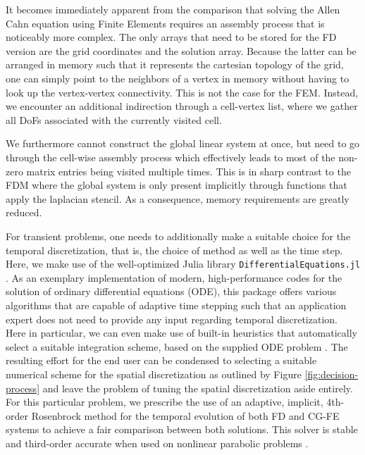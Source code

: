 \documentclass[asi,article,submit,moreauthors]{Definitions/mdpi}
\begin{document}
It becomes immediately apparent from the comparison that solving the Allen Cahn equation using Finite Elements requires an assembly process that is noticeably more complex.
The only arrays that need to be stored for the FD version are the grid coordinates and the solution array.
Because the latter can be arranged in memory such that it represents the cartesian topology of the grid, one can simply point to the neighbors of a vertex in memory without having to look up the vertex-vertex connectivity.
This is not the case for the FEM.
Instead, we encounter an additional indirection through a cell-vertex list, where we gather all DoFs associated with the currently visited cell.

We furthermore cannot construct the global linear system at once, but need to go through the cell-wise assembly process which effectively leads to most of the non-zero matrix entries being visited multiple times.
This is in sharp contrast to the FDM where the global system is only present implicitly through functions that apply the laplacian stencil.
As a consequence, memory requirements are greatly reduced.

For transient problems, one needs to additionally make a suitable choice for the temporal discretization, that is,  the choice of method as well as the time step.
Here, we make use of the well-optimized Julia library \texttt{DifferentialEquations.jl} \cite{rackauckasDifferentialequationsJlPerformant2017}.
As an exemplary implementation of modern, high-performance codes for the solution of ordinary differential equations (ODE), this package offers various algorithms that are capable of adaptive time stepping such that an application expert does not need to provide any input regarding temporal discretization.
Here in particular, we can even make use of built-in heuristics that automatically select a suitable integration scheme, based on the supplied ODE problem \cite{rackauckas2019confederated}.
The resulting effort for the end user can be condensed to selecting a suitable numerical scheme for the spatial discretization as outlined by Figure \ref{fig:decision-process} and leave the problem of tuning the spatial discretization aside entirely.
For this particular problem, we prescribe the use of an adaptive, implicit, 4th-order Rosenbrock method for the temporal evolution of both FD and CG-FE systems to achieve a fair comparison between both solutions.
This solver is stable and third-order accurate when used on nonlinear parabolic problems \cite{rackauckasDifferentialequationsJlPerformant2017}.
\end{document}
